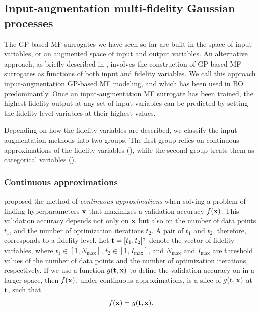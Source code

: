 \documentclass[journal ]{new-aiaa}
\begin{document}
\subsection{Input-augmentation multi-fidelity Gaussian processes}\label{Sec46}

The GP-based MF surrogates we have seen so far are built in the space of input variables, or an augmented space of input and output variables.
An alternative approach, as briefly described in , involves the construction of GP-based MF surrogates as functions of both input and fidelity variables.
We call this approach input-augmentation GP-based MF modeling, and which has been used in BO predominantly.
Once an input-augmentation MF surrogate has been trained, the highest-fidelity output at any set of input variables can be predicted by setting the fidelity-level variables at their highest values.

Depending on how the fidelity variables are described, we classify the input-augmentation methods into two groups.
The first group relies on continuous approximations of the fidelity variables (), while the second group treats them as categorical variables ().

\subsubsection{Continuous approximations}\label{Sec461}

\citet{Kandasamy2017} proposed the method of \textit{continuous approximations} when solving a problem of finding hyperparameters ${\bf x}$ that maximizes a validation accuracy $f({\bf x})$.
This validation accuracy depends not only on ${\bf x}$ but also on the number of data points $t_1$, and the number of optimization iterations $t_2$.
A pair of $t_1$ and $t_2$, therefore, corresponds to a fidelity level.
Let ${\bf t}=[t_1,t_2]^\intercal$ denote the vector of fidelity variables, where $t_1 \in [1,N_{\max}]$, $t_2 \in [1,I_{\max}]$, and $N_{\max}$ and $I_{\max}$ are threshold values of the number of data points and the number of optimization iterations, respectively.
If we use a function $g({\bf t},{\bf x})$ to define the validation accuracy on in a larger space, then $f({\bf x})$, under continuous approximations, is a slice of $g({\bf t},{\bf x})$ at ${\bf t}$, such that
\begin{equation}\label{eqn29}
	f({\bf x}) = g({\bf t},{\bf x}).
\end{equation}
\end{document}
